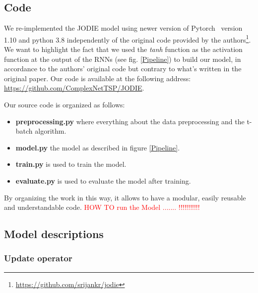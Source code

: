 
\subsection*{Code}
We re-implemented the JODIE model using newer version of Pytorch~\cite{NEURIPS2019_bdbca288} version 1.10 and python 3.8 independently of the original code provided by the authors\footnote{\url{https://github.com/srijankr/jodie}}. We want to highlight the fact that we used the \textit{tanh} function  as the activation function at the output of the RNNs (see fig. \ref{Pipeline}) to build our model,  in accordance to the authors' original code but contrary to what's written in the original paper. Our code is available at the following address: \url{https://github.com/ComplexNetTSP/JODIE}. 

Our source code is organized as follows:
\begin{itemize}
    \item \textbf{preprocessing.py} where everything about the data preprocessing and the t-batch algorithm.
    \item \textbf{model.py} the model as described in figure \ref{Pipeline}.
    \item \textbf{train.py} is used to train the model.
    \item \textbf{evaluate.py} is used to evaluate the model after training.
\end{itemize}
By organizing the work in this way, it allows to have a modular, easily reusable and understandable code.
\textcolor{red}{HOW TO run the Model ....... !!!!!!!!!!!}
\subsection*{Model descriptions}

\subsubsection{Update operator}

